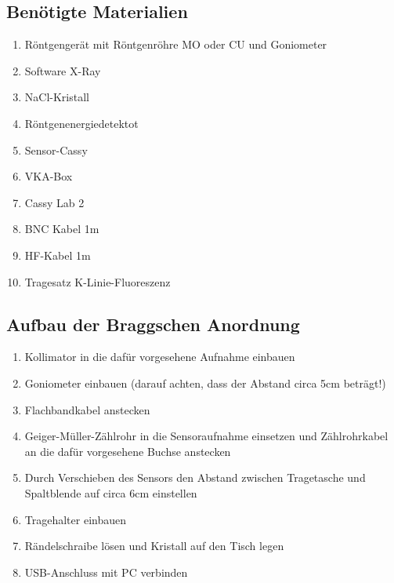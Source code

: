 \documentclass{article}
\begin{document}
\begin{center}

\end{center}

\subsection{Benötigte Materialien}
    \begin{enumerate}[label=\arabic*.]
        \item Röntgengerät mit Röntgenröhre MO oder CU und Goniometer
        \item Software X-Ray
        \item NaCl-Kristall
        \item Röntgenenergiedetektot
        \item Sensor-Cassy
        \item VKA-Box
        \item Cassy Lab 2
        \item BNC Kabel 1m
        \item HF-Kabel 1m
        \item Tragesatz K-Linie-Fluoreszenz
    \end{enumerate}

\newpage

\subsection{Aufbau der Braggschen Anordnung}   
    \begin{enumerate}[label=\arabic*.]
        \item Kollimator in die dafür vorgesehene Aufnahme einbauen
        \item Goniometer einbauen (darauf achten, dass der Abstand circa 5cm beträgt!)
        \item Flachbandkabel anstecken
        \item Geiger-Müller-Zählrohr in die Sensoraufnahme einsetzen und Zählrohrkabel an die dafür vorgesehene Buchse anstecken
        \item Durch Verschieben des Sensors den Abstand zwischen Tragetasche und Spaltblende auf circa 6cm einstellen
        \item Tragehalter einbauen
        \item Rändelschraibe lösen und Kristall auf den Tisch legen
        \item USB-Anschluss mit PC verbinden
    \end{enumerate}
\end{document}
